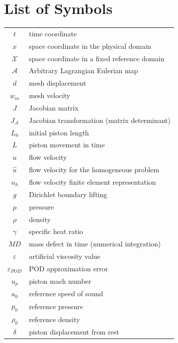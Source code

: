 \documentclass[thesis.tex]{subfiles}
\newcommand{\alemap}{\ensuremath{\mathcal{A}}}
\newcommand{\aleX}{\ensuremath{\mathcal{X}}}
\begin{document}
\section*{List of Symbols}

\begin{table}[h]        
    \begin{tabular}{cl}
        $t$ & time coordinate \\
        $x$ & space coordinate in the physical domain \\
        $\aleX$ & space coordinate in a fixed reference domain \\
        $\alemap$ & Arbitrary Lagrangian Eulerian map \\
        $d$ & mesh displacement \\
        $w_m$ & mesh velocity \\
        $J$ & Jacobian matrix \\
        $J_\alemap$ & Jacobian transformation (matrix determinant) \\
        $L_0$ & initial piston length \\
        $L$ & piston movement in time \\
        $u$ & flow velocity \\
        $\hat{u}$ & flow velocity for the homogeneous problem \\
        $u_h$ & flow velocity finite element representation \\ 
        $g$ & Dirichlet boundary lifting \\ 
        $p$ & pressure \\
        $\rho$ & density \\
        $\gamma$ & specific heat ratio \\
        $MD$ & mass defect in time (numerical integration) \\
        $\varepsilon$ & artificial viscosity value \\
        $\varepsilon_{POD}$ & POD approximation error \\
        $u_p$ & piston mach number \\
        $a_0$ & reference speed of sound \\
        $p_0$ & reference pressure \\
        $\rho_0$ & reference density \\
        $\delta$ & piston displacement from rest \\

\end{tabular}
\end{table}
\end{document}
